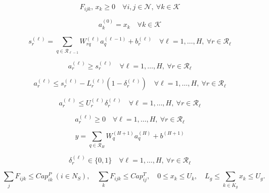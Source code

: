 \documentclass[10pt]{article}
\begin{document}
\begin{equation}
F_{ijk},\, x_k \ge 0
\quad \forall i,j \in \mathcal N,\ \forall k \in \mathcal K
\tag{6i}
\end{equation}

\begin{equation}
a_k^{(0)} = x_k
\quad \forall k \in \mathcal K
\tag{Emb-a}
\end{equation}

\begin{equation}
s_r^{(\ell)} =
\sum_{q \in \mathcal R_{\ell-1}} W_{rq}^{(\ell)} a_q^{(\ell-1)} + b_r^{(\ell)}
\quad \forall \ell=1,\dots,H,\ \forall r \in \mathcal R_\ell
\tag{Emb-b}
\end{equation}

\begin{equation}
a_r^{(\ell)} \ge s_r^{(\ell)}
\quad \forall \ell=1,\dots,H,\ \forall r \in \mathcal R_\ell
\tag{Emb-c}
\end{equation}

\begin{equation}
a_r^{(\ell)} \le s_r^{(\ell)} - L_r^{(\ell)} \left(1-\delta_r^{(\ell)}\right)
\quad \forall \ell=1,\dots,H,\ \forall r \in \mathcal R_\ell
\tag{Emb-d}
\end{equation}

\begin{equation}
a_r^{(\ell)} \le U_r^{(\ell)} \delta_r^{(\ell)}
\quad \forall \ell=1,\dots,H,\ \forall r \in \mathcal R_\ell
\tag{Emb-e}
\end{equation}

\begin{equation}
a_r^{(\ell)} \ge 0
\quad \forall \ell=1,\dots,H,\ \forall r \in \mathcal R_\ell
\tag{Emb-f}
\end{equation}

\begin{equation}
y =
\sum_{q \in \mathcal R_H} W_q^{(H+1)} a_q^{(H)} + b^{(H+1)}
\tag{Emb-g}
\end{equation}

\begin{equation}
\delta_r^{(\ell)} \in \{0,1\}
\quad \forall \ell=1,\dots,H,\ \forall r \in \mathcal R_\ell
\tag{Emb-h}
\end{equation}

\[
\sum_jF_{ijk}\le Cap^P_{ik}\ (i\in N_S),\quad
\sum_kF_{ijk}\le Cap^T_{ij},\quad0\le x_k\le U_k,\quad
L_g\le\sum_{k\in K_g}x_k\le U_g.
\]
\end{document}
